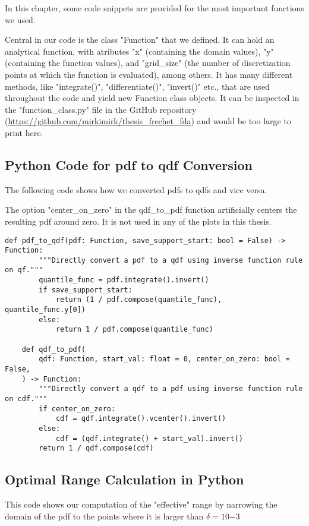 In this chapter, some code snippets are provided for the most important functions we
used.

Central in our code is the class "Function" that we defined. It can hold an analytical
function, with atributes "x" (containing the domain values), "y" (containing the function
values), and "grid\_size" (the number of discretization points at which the function
is evaluated), among others. It has many different methods, like "integrate()",
"differentiate()", "invert()" etc., that are used throughout the code and yield new 
Function class objects. It can be inspected in the "function\_class.py" file in the
GitHub repository (\url{https://github.com/mirkimirk/thesis_frechet_fda}) and would be
too large to print here.

\subsection{Python Code for pdf to qdf Conversion}
\label{sec:code_pdf_to_qdf}
The following code shows how we converted pdfs to qdfs and vice versa.

The option "center\_on\_zero" in the qdf\_to\_pdf function artificially centers the resulting
pdf around zero. It is not used in any of the plots in this thesis.

\begin{lstlisting}[style=python]
    def pdf_to_qdf(pdf: Function, save_support_start: bool = False) -> Function:
        """Directly convert a pdf to a qdf using inverse function rule on qf."""
        quantile_func = pdf.integrate().invert()
        if save_support_start:
            return (1 / pdf.compose(quantile_func), quantile_func.y[0])
        else:
            return 1 / pdf.compose(quantile_func)
    
    def qdf_to_pdf(
        qdf: Function, start_val: float = 0, center_on_zero: bool = False,
    ) -> Function:
        """Directly convert a qdf to a pdf using inverse function rule on cdf."""
        if center_on_zero:
            cdf = qdf.integrate().vcenter().invert()
        else:
            cdf = (qdf.integrate() + start_val).invert()
        return 1 / qdf.compose(cdf)
\end{lstlisting}

\subsection{Optimal Range Calculation in Python}
\label{sec:code_optimal_range}
This code shows our computation of the "effective" range by narrowing the domain
of the pdf to the points where it is larger than $\delta = 10{-3}$

